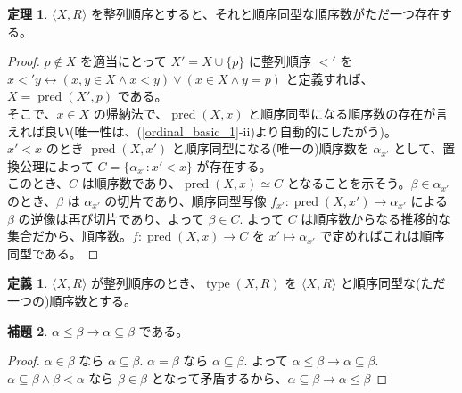 \documentclass{jsarticle}
\theoremstyle{definition}
\newtheorem*{definition*}{定義}
\newtheorem{theorem}{定理}[section]
\newtheorem{lemma}[theorem]{補題}
\begin{document}
    \begin{theorem}
        $\langle X, R \rangle$ を整列順序とすると、それと順序同型な順序数がただ一つ存在する。
    \end{theorem}
    \begin{proof}
        $p \not\in X$ を適当にとって $X' = X \cup \{p\}$ に整列順序 $<'$ を\\
        $x <' y \leftrightarrow (x, y \in X \land x < y) \lor (x \in X \land y = p)$ と定義すれば、$X = \operatorname{pred}(X', p)$ である。\\
        そこで、$x \in X$ の帰納法で、$\operatorname{pred}(X, x)$ と順序同型になる順序数の存在が言えれば良い(唯一性は、(\ref{ordinal_basic_1}-ii)より自動的にしたがう)。\\
        $x' < x$ のとき $\operatorname{pred}(X, x')$ と順序同型になる(唯一の)順序数を $\alpha_{x'}$ として、置換公理によって $C = \{\alpha_{x'} : x' < x\}$ が存在する。\\
        このとき、$C$ は順序数であり、$\operatorname{pred}(X, x) \simeq C$ となることを示そう。$\beta \in \alpha_{x'}$ のとき、$\beta$ は $\alpha_{x'}$ の切片であり、順序同型写像 $f_{x'} : \operatorname{pred}(X, x') \rightarrow \alpha_{x'}$ による $\beta$ の逆像は再び切片であり、よって $\beta \in C.$ よって $C$ は順序数からなる推移的な集合だから、順序数。$f : \operatorname{pred}(X, x) \rightarrow C$ を $x' \mapsto \alpha_{x'}$ で定めればこれは順序同型である。
    \end{proof}
    \begin{definition*}
        $\langle X, R \rangle$ が整列順序のとき、$\operatorname{type}(X, R)$ を $\langle X, R \rangle$ と順序同型な(ただ一つの)順序数とする。
    \end{definition*}
    \vspace{1ex}
    
    \begin{lemma} \label{ordinal_basic_3} $\alpha \leq \beta \rightarrow \alpha \subseteq \beta$ である。
    \end{lemma}
    \begin{proof}
        $\alpha \in \beta$ なら $\alpha \subseteq \beta.$ $\alpha = \beta$ なら $\alpha \subseteq \beta.$ よって $\alpha \leq \beta \rightarrow \alpha \subseteq \beta.$ \\
        $\alpha \subseteq \beta \land \beta < \alpha$ なら $\beta \in \beta$ となって矛盾するから、$\alpha \subseteq \beta \rightarrow \alpha \leq \beta$
    \end{proof}
        
\end{document}
